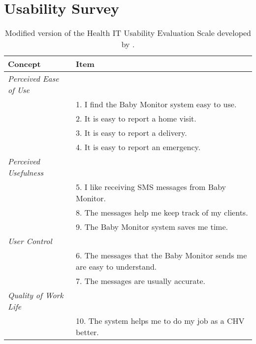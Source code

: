 \chapter{Usability Survey }


\begin{table}[htp]
  \centering
  \caption{Modified version of the Health IT Usability Evaluation Scale developed by \cite{Yen2010}.}
    \begin{tabular}{ll}
    \toprule
    \textbf{Concept} & \textbf{Item} \\
    \midrule
    \textit{Perceived Ease of Use} &  \\
    \textit{} & 1. I find the Baby Monitor system easy to use.  \\
    \textit{} & 2. It is easy to report a home visit. \\
    \textit{} & 3. It is easy to report a delivery.  \\
    \textit{} & 4. It is easy to report an emergency.  \\
    \textit{Perceived Usefulness} &  \\
    \textit{} & 5. I like receiving SMS messages from Baby Monitor.  \\
    \textit{} & 8. The messages help me keep track of my clients.  \\
    \textit{} & 9. The Baby Monitor system saves me time.  \\
    \textit{User Control} &  \\
    \textit{} & 6. The messages that the Baby Monitor sends me are easy to understand.  \\
    \textit{} & 7. The messages are usually accurate.  \\
    \textit{Quality of Work Life} & \textbf{} \\
          & 10. The system helps me to do my job as a CHV better.  \\
    \bottomrule
    \end{tabular}%
  \label{tab:usabilitysurvey}%
\end{table}%


